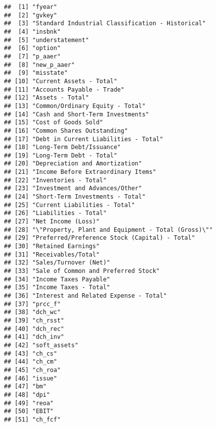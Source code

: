 \documentclass[
]{article}
\begin{document}
\begin{verbatim}
##  [1] "fyear"                                            
##  [2] "gvkey"                                            
##  [3] "Standard Industrial Classification - Historical"  
##  [4] "insbnk"                                           
##  [5] "understatement"                                   
##  [6] "option"                                           
##  [7] "p_aaer"                                           
##  [8] "new_p_aaer"                                       
##  [9] "misstate"                                         
## [10] "Current Assets - Total"                           
## [11] "Accounts Payable - Trade"                         
## [12] "Assets - Total"                                   
## [13] "Common/Ordinary Equity - Total"                   
## [14] "Cash and Short-Term Investments"                  
## [15] "Cost of Goods Sold"                               
## [16] "Common Shares Outstanding"                        
## [17] "Debt in Current Liabilities - Total"              
## [18] "Long-Term Debt/Issuance"                          
## [19] "Long-Term Debt - Total"                           
## [20] "Depreciation and Amortization"                    
## [21] "Income Before Extraordinary Items"                
## [22] "Inventories - Total"                              
## [23] "Investment and Advances/Other"                    
## [24] "Short-Term Investments - Total"                   
## [25] "Current Liabilities - Total"                      
## [26] "Liabilities - Total"                              
## [27] "Net Income (Loss)"                                
## [28] "\"Property, Plant and Equipment - Total (Gross)\""
## [29] "Preferred/Preference Stock (Capital) - Total"     
## [30] "Retained Earnings"                                
## [31] "Receivables/Total"                                
## [32] "Sales/Turnover (Net)"                             
## [33] "Sale of Common and Preferred Stock"               
## [34] "Income Taxes Payable"                             
## [35] "Income Taxes - Total"                             
## [36] "Interest and Related Expense - Total"             
## [37] "prcc_f"                                           
## [38] "dch_wc"                                           
## [39] "ch_rsst"                                          
## [40] "dch_rec"                                          
## [41] "dch_inv"                                          
## [42] "soft_assets"                                      
## [43] "ch_cs"                                            
## [44] "ch_cm"                                            
## [45] "ch_roa"                                           
## [46] "issue"                                            
## [47] "bm"                                               
## [48] "dpi"                                              
## [49] "reoa"                                             
## [50] "EBIT"                                             
## [51] "ch_fcf"
\end{verbatim}
\end{document}
